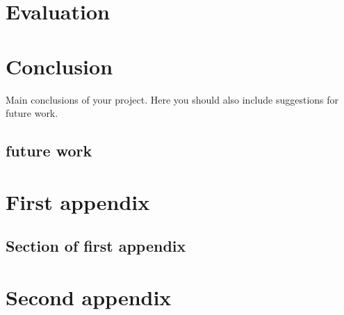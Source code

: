\documentclass{mproj}
\begin{document}
\chapter{Evaluation}


\chapter{Conclusion}\label{conclusion}

Main conclusions of your project. Here you should also include suggestions for future work.

\section{future work}


\appendix %
\chapter{First appendix}

\section{Section of first appendix}

\chapter{Second appendix}



\end{document}
